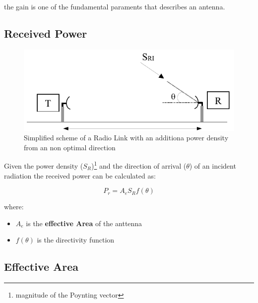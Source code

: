 the gain is one of the fundamental paraments that describes an antenna.


\subsection{Received Power} %
\label{sub:received_power}


\begin{figure}[h]
	\centering
	\includegraphics[scale=0.3]{Immagini/SR}
	
	\caption{Simplified scheme of a Radio Link with an additiona power density from an non optimal direction}
	\label{fig:SR}
\end{figure}

Given the power density ($S_R$)\footnote{magnitude of the Poynting vector} and the direction of arrival ($ \theta $) of an incident radiation the received power can be calculated as:

\begin{equation}
	P_r=A_{\textit{e}} S_R f(\theta)
\end{equation}

where:

\begin{itemize}
	\item $A_{\textit{e}}$ is the \textbf{effective Area} of the anttenna
	\item $f(\theta)$ is the directivity function

\end{itemize}




\subsection{Effective Area} %
\label{sub:effective_area}



